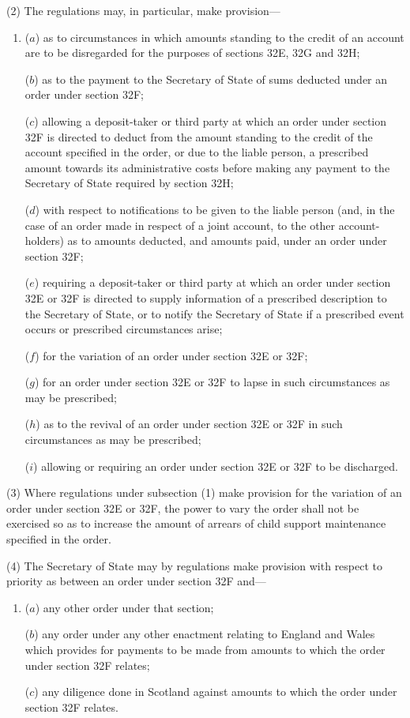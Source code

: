 \documentclass[12pt,a4paper]{article}
\begin{document}
(2) The regulations may, in particular, make provision---
\begin{enumerate}\item[]
($a$) as to circumstances in which amounts standing to the credit of an account are to be disregarded for the purposes of sections 32E, 32G and 32H;

($b$) as to the payment to the Secretary of State of sums deducted under an order under section 32F;

($c$) allowing a deposit-taker or third party at which an order under section 32F is directed to deduct from the amount standing to the credit of the account specified in the order, or due to the liable person, a prescribed amount towards its administrative costs before making any payment to the Secretary of State required by section 32H;

($d$) with respect to notifications to be given to the liable person (and, in the case of an order made in respect of a joint account, to the other account-holders) as to amounts deducted, and amounts paid, under an order under section 32F;

($e$) requiring a deposit-taker or third party at which an order under section 32E or 32F is directed to supply information of a prescribed description to the Secretary of State, or to notify the Secretary of State if a prescribed event occurs or prescribed circumstances arise;

($f$) for the variation of an order under section 32E or 32F;

($g$) for an order under section 32E or 32F to lapse in such circumstances as may be prescribed;

($h$) as to the revival of an order under section 32E or 32F in such circumstances as may be prescribed;

($i$) allowing or requiring an order under section 32E or 32F to be discharged.
\end{enumerate}

(3)
Where regulations under subsection (1) make provision for the variation of an order under section 32E or 32F, the power to vary the order shall not be exercised so as to increase the amount of arrears of child support maintenance specified in the order.

(4)
The Secretary of State may by regulations make provision with respect to priority as between an order under section 32F and---
\begin{enumerate}\item[]
($a$) any other order under that section;

($b$) any order under any other enactment relating to England and Wales which provides for payments to be made from amounts to which the order under section 32F relates;

($c$) any diligence done in Scotland against amounts to which the order under section 32F relates.
\end{enumerate}
\end{document}
